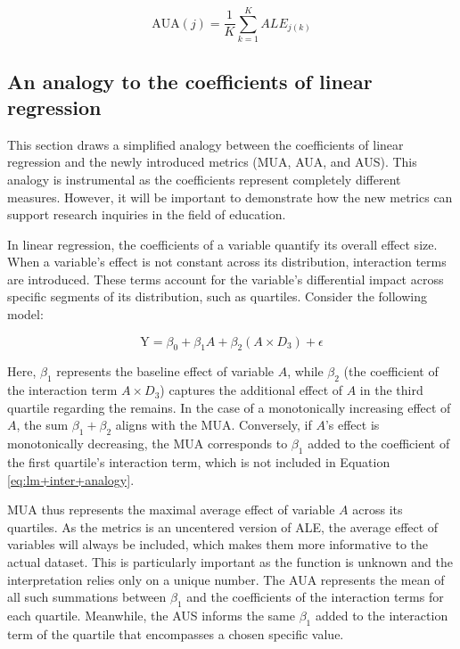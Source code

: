 \begin{equation}
\label{eq:AUA}
\text{AUA}(j) = \frac{1}{K} \sum_{k=1}^{K} ALE_{j(k)}
\end{equation}


\subsection{An analogy to the coefficients of linear regression}

This section draws a simplified analogy between the coefficients of linear regression and the newly introduced metrics (MUA, AUA, and AUS). This analogy is instrumental as the coefficients represent completely different measures. However, it will be important to demonstrate how the new metrics can support research inquiries in the field of education.

In linear regression, the coefficients of a variable quantify its overall effect size. When a variable's effect is not constant across its distribution, interaction terms are introduced. These terms account for the variable's differential impact across specific segments of its distribution, such as quartiles. Consider the following model:

\begin{equation}
\label{eq:lm+inter+analogy}
\text{Y} = \beta_0 + \beta_1 A + \beta_2 (A \times D_3) + \epsilon
\end{equation}

Here, \(\beta_1\) represents the baseline effect of variable \(A\), while \(\beta_2\) (the coefficient of the interaction term \(A \times D_3\)) captures the additional effect of \(A\) in the third quartile regarding the remains. In the case of a monotonically increasing effect of \(A\), the sum \(\beta_1 + \beta_2\) aligns with the MUA. Conversely, if \(A\)'s effect is monotonically decreasing, the MUA corresponds to \(\beta_1\) added to the coefficient of the first quartile's interaction term, which is not included in Equation \ref{eq:lm+inter+analogy}.

MUA thus represents the maximal average effect of variable \(A\) across its quartiles. As the metrics is an uncentered version of ALE, the average effect of variables will always be included, which makes them more informative to the actual dataset. This is particularly important as the function is unknown and the interpretation relies only on a unique number. The AUA represents the mean of all such summations between \(\beta_1\) and the coefficients of the interaction terms for each quartile. Meanwhile, the AUS informs the same \(\beta_1\) added to the interaction term of the quartile that encompasses a chosen specific value. 

